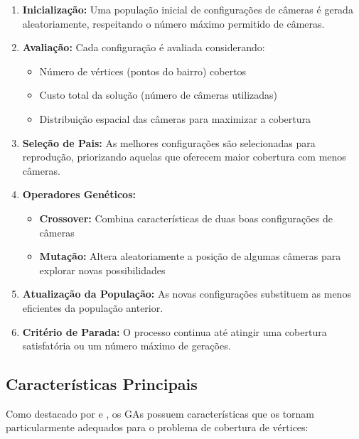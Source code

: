\documentclass[12pt, a4paper]{report}
\begin{document}
\begin{enumerate}
    \item \textbf{Inicialização:} Uma população inicial de configurações de câmeras é gerada aleatoriamente, respeitando o número máximo permitido de câmeras.
    
    \item \textbf{Avaliação:} Cada configuração é avaliada considerando:
    \begin{itemize}
        \item Número de vértices (pontos do bairro) cobertos
        \item Custo total da solução (número de câmeras utilizadas)
        \item Distribuição espacial das câmeras para maximizar a cobertura
    \end{itemize}
    
    \item \textbf{Seleção de Pais:} As melhores configurações são selecionadas para reprodução, priorizando aquelas que oferecem maior cobertura com menos câmeras.
    
    \item \textbf{Operadores Genéticos:}
    \begin{itemize}
        \item \textbf{Crossover:} Combina características de duas boas configurações de câmeras
        \item \textbf{Mutação:} Altera aleatoriamente a posição de algumas câmeras para explorar novas possibilidades
    \end{itemize}
    
    \item \textbf{Atualização da População:} As novas configurações substituem as menos eficientes da população anterior.
    
    \item \textbf{Critério de Parada:} O processo continua até atingir uma cobertura satisfatória ou um número máximo de gerações.
\end{enumerate}

\subsection{Características Principais}
Como destacado por \cite{Holland1975} e \cite{Linden2006}, os GAs possuem características que os tornam particularmente adequados para o problema de cobertura de vértices:
\end{document}
